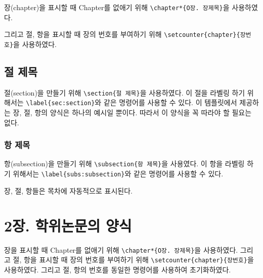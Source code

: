 \documentclass[11pt]{report}
\begin{document}
장(chapter)을 표시할 때 Chapter를 없애기 위해 \verb|\chapter*{O장. 장제목}|을 사용하였다.\par
그리고 절, 항을 표시할 때 장의 번호를 부여하기 위해 \verb|\setcounter{chapter}{장번호}|을 사용하였다.\par

\section{절 제목}\label{sec:section}
절(section)을 만들기 위해 \verb|\section{절 제목}|을 사용하였다.
이 절을 라벨링 하기 위해서는 \verb|\label{sec:section}|와 같은 명령어를 사용할 수 있다.
이 템플릿에서 제공하는 장, 절, 항의 양식은 하나의 예시일 뿐이다.
따라서 이 양식을 꼭 따라야 할 필요는 없다.

%
\subsection{항 제목}\label{subs:subsection}
항(subsection)을 만들기 위해 \verb|\subsection{항 제목}|을 사용였다.
이 항을 라벨링 하기 위해서는 \verb|\label{subs:subsection}|와 같은 명령어를 사용할 수 있다.

장, 절, 항들은 목차에 자동적으로 표시된다.

\chapter*{2장. 학위논문의 양식}
\setcounter{chapter}{2}
\setcounter{section}{0}
\setcounter{subsection}{0}

장을 표시할 때 Chapter를 없애기 위해 \verb|\chapter*{O장. 장제목}|을 사용하였다. 그리고 절, 항을 표시할 때 장의 번호를 부여하기 위해 \verb|\setcounter{chapter}{장번호}|을 사용하였다. 그리고 절, 항의 번호를 동일한 명령어를 사용하여 초기화하였다.\par
\end{document}
